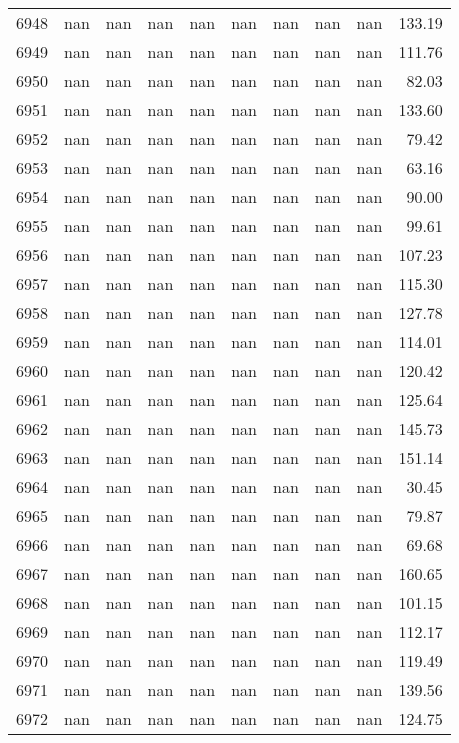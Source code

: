 \begin{tabular}{lrrrrrrrrr}
6948 & nan & nan & nan & nan & nan & nan & nan & nan & 133.19 \\
6949 & nan & nan & nan & nan & nan & nan & nan & nan & 111.76 \\
6950 & nan & nan & nan & nan & nan & nan & nan & nan & 82.03 \\
6951 & nan & nan & nan & nan & nan & nan & nan & nan & 133.60 \\
6952 & nan & nan & nan & nan & nan & nan & nan & nan & 79.42 \\
6953 & nan & nan & nan & nan & nan & nan & nan & nan & 63.16 \\
6954 & nan & nan & nan & nan & nan & nan & nan & nan & 90.00 \\
6955 & nan & nan & nan & nan & nan & nan & nan & nan & 99.61 \\
6956 & nan & nan & nan & nan & nan & nan & nan & nan & 107.23 \\
6957 & nan & nan & nan & nan & nan & nan & nan & nan & 115.30 \\
6958 & nan & nan & nan & nan & nan & nan & nan & nan & 127.78 \\
6959 & nan & nan & nan & nan & nan & nan & nan & nan & 114.01 \\
6960 & nan & nan & nan & nan & nan & nan & nan & nan & 120.42 \\
6961 & nan & nan & nan & nan & nan & nan & nan & nan & 125.64 \\
6962 & nan & nan & nan & nan & nan & nan & nan & nan & 145.73 \\
6963 & nan & nan & nan & nan & nan & nan & nan & nan & 151.14 \\
6964 & nan & nan & nan & nan & nan & nan & nan & nan & 30.45 \\
6965 & nan & nan & nan & nan & nan & nan & nan & nan & 79.87 \\
6966 & nan & nan & nan & nan & nan & nan & nan & nan & 69.68 \\
6967 & nan & nan & nan & nan & nan & nan & nan & nan & 160.65 \\
6968 & nan & nan & nan & nan & nan & nan & nan & nan & 101.15 \\
6969 & nan & nan & nan & nan & nan & nan & nan & nan & 112.17 \\
6970 & nan & nan & nan & nan & nan & nan & nan & nan & 119.49 \\
6971 & nan & nan & nan & nan & nan & nan & nan & nan & 139.56 \\
6972 & nan & nan & nan & nan & nan & nan & nan & nan & 124.75 \\

\end{tabular}
